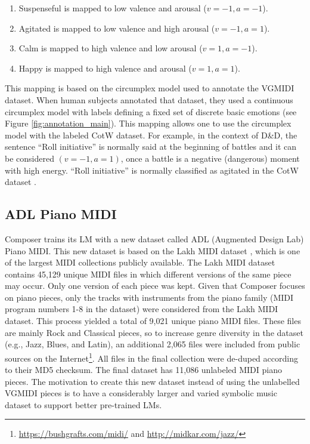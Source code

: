 \begin{enumerate}
    \item Suspenseful is mapped to low valence and arousal ($v = -1, a = -1$).
    \item Agitated is mapped to low valence and high arousal ($v = -1, a = 1$).
    \item Calm is mapped to high valence and low arousal ($v = 1, a = -1$).
    \item Happy is mapped to high valence and arousal ($v = 1, a = 1$).
\end{enumerate}

This mapping is based on the circumplex model used to annotate the VGMIDI dataset. When human subjects annotated that dataset, they used a continuous circumplex model with labels defining a fixed set of discrete basic emotions (see Figure \ref{fig:annotation_main}). This mapping allows one to use the circumplex model with the labeled CotW dataset. For example, in the context of D\&D, the sentence ``Roll initiative'' is normally said at the beginning of battles and it can be considered $(v = -1, a = 1)$, once a battle is a negative (dangerous) moment with high energy. ``Roll initiative'' is normally classified as agitated in the CotW dataset \cite{padovani2017}.

\subsection{ADL Piano MIDI}

Composer trains its LM with a new dataset called ADL (Augmented Design Lab) Piano MIDI. This new dataset is based on the Lakh MIDI dataset \cite{raffel2016learning}, which is one of the largest MIDI collections publicly available. The Lakh MIDI dataset contains 45,129 unique MIDI files in which different versions of the same piece may occur. Only one version of each piece was kept. Given that Composer focuses on piano pieces, only the tracks with instruments from the piano family (MIDI program numbers 1-8 in the dataset) were considered from the Lakh MIDI dataset. This process yielded a total of 9,021 unique piano MIDI files. These files are mainly Rock and Classical pieces, so to increase genre diversity in the dataset (e.g., Jazz, Blues, and Latin), an additional 2,065 files were included from public sources on the Internet\footnote{\url{https://bushgrafts.com/midi/} and \url{http://midkar.com/jazz/}}. All files in the final collection were de-duped according to their MD5 checksum. The final dataset has 11,086 unlabeled MIDI piano pieces. The motivation to create this new dataset instead of using the unlabelled VGMIDI pieces is to have a considerably larger and varied symbolic music dataset to support better pre-trained LMs.

